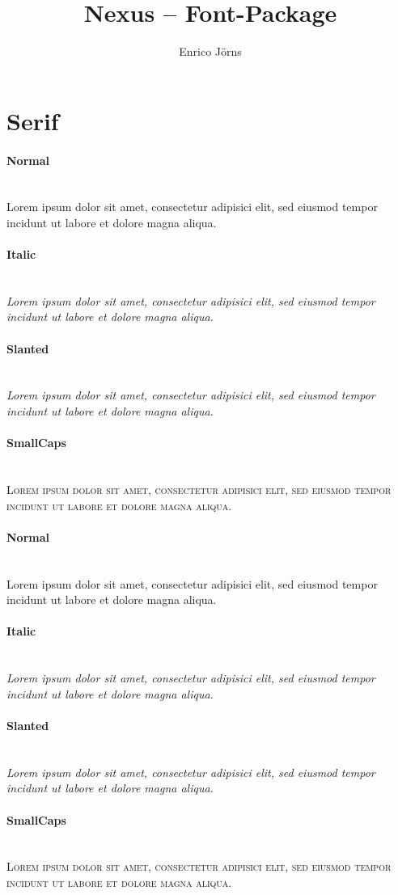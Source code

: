 \documentclass{scrartcl}
\title{Nexus -- Font-Package}
\author{Enrico Jörns}
\begin{document}
\maketitle

\section*{Serif}

\paragraph{Normal}\hfill\\
{
Lorem ipsum dolor sit amet, consectetur adipisici elit, sed eiusmod tempor
incidunt ut labore et dolore magna aliqua.}
\paragraph{Italic}\hfill\\
{\itshape
Lorem ipsum dolor sit amet, consectetur adipisici elit, sed eiusmod tempor
incidunt ut labore et dolore magna aliqua.}
\paragraph{Slanted}\hfill\\
{\slshape
Lorem ipsum dolor sit amet, consectetur adipisici elit, sed eiusmod tempor
incidunt ut labore et dolore magna aliqua.}
\paragraph{SmallCaps}\hfill\\
{\scshape
Lorem ipsum dolor sit amet, consectetur adipisici elit, sed eiusmod tempor
incidunt ut labore et dolore magna aliqua.}

{\bfseries
\paragraph{Normal}\hfill\\
{
Lorem ipsum dolor sit amet, consectetur adipisici elit, sed eiusmod tempor
incidunt ut labore et dolore magna aliqua.}
\paragraph{Italic}\hfill\\
{\itshape
Lorem ipsum dolor sit amet, consectetur adipisici elit, sed eiusmod tempor
incidunt ut labore et dolore magna aliqua.}
\paragraph{Slanted}\hfill\\
{\slshape
Lorem ipsum dolor sit amet, consectetur adipisici elit, sed eiusmod tempor
incidunt ut labore et dolore magna aliqua.}
\paragraph{SmallCaps}\hfill\\
{\scshape
Lorem ipsum dolor sit amet, consectetur adipisici elit, sed eiusmod tempor
incidunt ut labore et dolore magna aliqua.}
}
\end{document}
